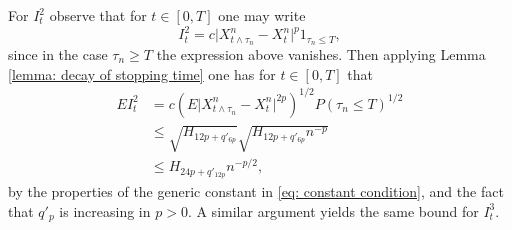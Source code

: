 \documentclass{article}
\begin{document}
    For $I^2_t$ observe that for $t\in [0,T]$ one may write
    \begin{equation}
        I^2_t=c\lvert X^n_{t\wedge \tau_n}-X^n_t\rvert^p1_{\tau_n\leq T},
    \end{equation}
    since in the case $\tau_n\geq T$ the expression above vanishes. Then applying Lemma \ref{lemma: decay of stopping time} one has for $t\in [0,T]$ that
    \begin{align}
        EI^2_t&=c(E\lvert X^n_{t\wedge \tau_n}-X^n_t\rvert^{2p})^{1/2}P(
        \tau_n\leq T)^{1/2}\nonumber \\
        &\leq  \sqrt{H_{12p+q'_{6p}}}\sqrt{H_{12p+q'_{6p}}n^{-p}} \nonumber \\
        &\leq H_{24p+q'_{12p}}n^{-p/2},
    \end{align}
    by the properties of the generic constant in \eqref{eq: constant condition}, and the fact that $q'_p$ is increasing in $p>0$. A similar argument yields the same bound for $I^3_t$.
\end{document}

